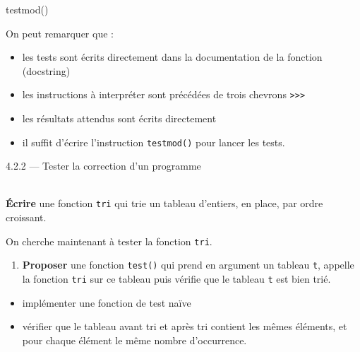 \documentclass[a4paper,17pt]{extarticle}
\newenvironment{eleve}%
{\begin{activite}\color{noiramu}\\[-0.5cm]}
{\end{activite}}
\providecommand{\tightlist}{%
      \setlength{\itemsep}{0pt}\setlength{\parskip}{0pt}}
\newenvironment{Shaded}{}{}
\newcommand{\NormalTok}[1]{{#1}}
\begin{document}
\begin{exemple}
\begin{Shaded}
\begin{Highlighting}[]
\NormalTok{testmod()}
\end{Highlighting}
\end{Shaded}

On peut remarquer que :

\begin{itemize}
\tightlist
\item
  les tests sont écrits directement dans la documentation de la fonction
  (docstring)
\item
  les instructions à interpréter sont précédées de trois chevrons
  \texttt{\textgreater{}\textgreater{}\textgreater{}}
\item
  les résultats attendus sont écrits directement
\item
  il suffit d'écrire l'instruction \texttt{testmod()} pour lancer les
  tests.
\end{itemize}

        \end{exemple}
    4.2.2 --- Tester la correction d'un programme
\begin{eleve}
    \textbf{Écrire} une fonction \texttt{tri} qui trie un tableau d'entiers,
en place, par ordre croissant.

On cherche maintenant à tester la fonction \texttt{tri}.

\begin{enumerate}
\def\labelenumi{\arabic{enumi}.}
\setcounter{enumi}{1}
\tightlist
\item
  \textbf{Proposer} une fonction \texttt{test()} qui prend en argument
  un tableau \texttt{t}, appelle la fonction \texttt{tri} sur ce tableau
  puis vérifie que le tableau \texttt{t} est bien trié.
\end{enumerate}

\begin{itemize}
\tightlist
\item
  implémenter une fonction de test naïve
\item
  vérifier que le tableau avant tri et après tri contient les mêmes
  éléments, et pour chaque élément le même nombre d'occurrence.
\end{itemize}
        
        \end{eleve}
\end{document}
